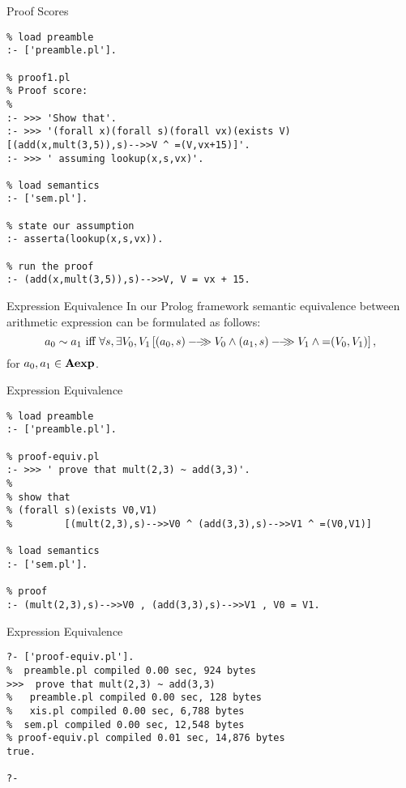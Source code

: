 \documentclass{beamer}
\begin{document}
\begin{frame}[fragile]{\large Proof Scores}
\tiny
\begin{verbatim}
% load preamble
:- ['preamble.pl'].

% proof1.pl
% Proof score:
%
:- >>> 'Show that'.
:- >>> '(forall x)(forall s)(forall vx)(exists V)[(add(x,mult(3,5)),s)-->>V ^ =(V,vx+15)]'.
:- >>> ' assuming lookup(x,s,vx)'.

% load semantics
:- ['sem.pl'].

% state our assumption
:- asserta(lookup(x,s,vx)).                                                                 
                                                                                            
% run the proof                                                                             
:- (add(x,mult(3,5)),s)-->>V, V = vx + 15.
\end{verbatim}
\end{frame}

\begin{frame}{Expression Equivalence}
\small
In our Prolog framework semantic equivalence between arithmetic expression
can be formulated as follows:
\[
a_0 \sim a_1 \mbox{ iff } \forall s,\exists V_0,V_1\left[ \sem{(a_0,s)}{V_0}\wedge \sem{(a_1,s)}{V_1} \wedge \mbox{=}(V_0,V_1) \right ],
\]
for $a_0, a_1 \in \mbox{\bf Aexp}$.

\end{frame}

\begin{frame}[fragile]{Expression Equivalence}
\small
\begin{verbatim}
% load preamble
:- ['preamble.pl'].

% proof-equiv.pl
:- >>> ' prove that mult(2,3) ~ add(3,3)'.
%
% show that
% (forall s)(exists V0,V1)
%         [(mult(2,3),s)-->>V0 ^ (add(3,3),s)-->>V1 ^ =(V0,V1)]

% load semantics
:- ['sem.pl'].

% proof
:- (mult(2,3),s)-->>V0 , (add(3,3),s)-->>V1 , V0 = V1.
\end{verbatim}
\end{frame}


\begin{frame}[fragile]{Expression Equivalence}
\scriptsize
\begin{verbatim}
?- ['proof-equiv.pl'].
%  preamble.pl compiled 0.00 sec, 924 bytes
>>>  prove that mult(2,3) ~ add(3,3)
%   preamble.pl compiled 0.00 sec, 128 bytes
%   xis.pl compiled 0.00 sec, 6,788 bytes
%  sem.pl compiled 0.00 sec, 12,548 bytes
% proof-equiv.pl compiled 0.01 sec, 14,876 bytes
true.

?- 
\end{verbatim}

\end{frame}
\end{document}
